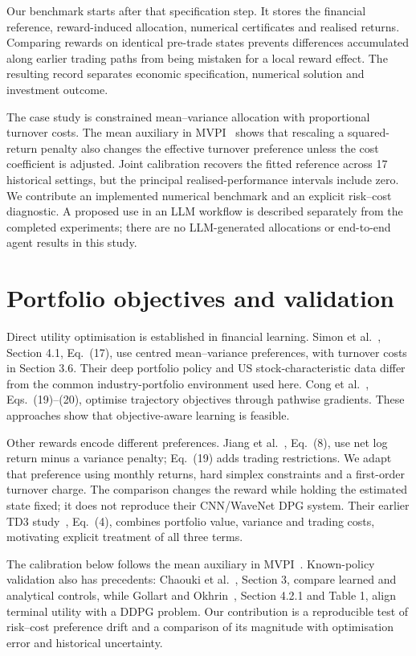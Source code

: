 \documentclass[sigconf,anonymous,review]{acmart}
\begin{document}
Our benchmark starts after that specification step. It stores the financial reference, reward-induced allocation, numerical certificates and realised returns. Comparing rewards on identical pre-trade states prevents differences accumulated along earlier trading paths from being mistaken for a local reward effect. The resulting record separates economic specification, numerical solution and investment outcome.

The case study is constrained mean--variance allocation with proportional turnover costs. The mean auxiliary in MVPI\ \cite{zhang2021} shows that rescaling a squared-return penalty also changes the effective turnover preference unless the cost coefficient is adjusted. Joint calibration recovers the fitted reference across 17 historical settings, but the principal realised-performance intervals include zero. We contribute an implemented numerical benchmark and an explicit risk--cost diagnostic. A proposed use in an LLM workflow is described separately from the completed experiments; there are no LLM-generated allocations or end-to-end agent results in this study.

\section{Portfolio objectives and validation}
Direct utility optimisation is established in financial learning. Simon et al.\ \cite{simon2026}, Section 4.1, Eq.\ (17), use centred mean--variance preferences, with turnover costs in Section 3.6. Their deep portfolio policy and US stock-characteristic data differ from the common industry-portfolio environment used here. Cong et al.\ \cite{cong2026}, Eqs.\ (19)--(20), optimise trajectory objectives through pathwise gradients. These approaches show that objective-aware learning is feasible.

Other rewards encode different preferences. Jiang et al.\ \cite{jiang2025}, Eq.\ (8), use net log return minus a variance penalty; Eq.\ (19) adds trading restrictions. We adapt that preference using monthly returns, hard simplex constraints and a first-order turnover charge. The comparison changes the reward while holding the estimated state fixed; it does not reproduce their CNN/WaveNet DPG system. Their earlier TD3 study\ \cite{jiang2024}, Eq.\ (4), combines portfolio value, variance and trading costs, motivating explicit treatment of all three terms.

The calibration below follows the mean auxiliary in MVPI\ \cite{zhang2021}. Known-policy validation also has precedents: Chaouki et al.\ \cite{chaouki2020}, Section 3, compare learned and analytical controls, while Gollart and Okhrin\ \cite{gollart2025}, Section 4.2.1 and Table 1, align terminal utility with a DDPG problem. Our contribution is a reproducible test of risk--cost preference drift and a comparison of its magnitude with optimisation error and historical uncertainty.
\end{document}
